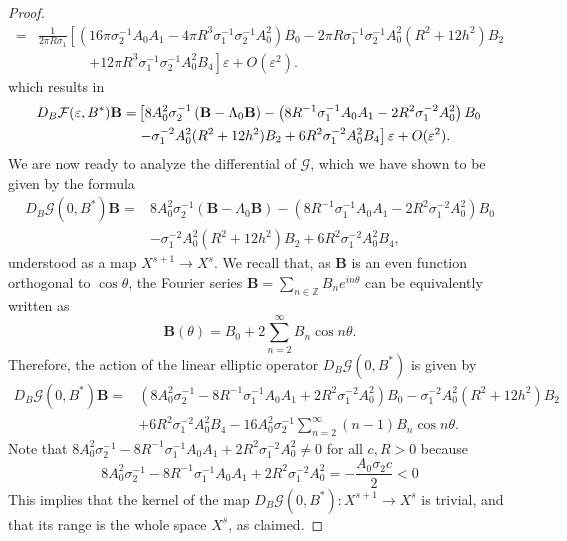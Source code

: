\documentclass[12pt,reqno]{amsart}
\numberwithin{equation}{section}
\theoremstyle{definition}
\theoremstyle{remark}
\begin{document}
\begin{proof}
\begin{align*}
=& \frac{1}{2\pi R\sigma_1}\left[ \left (16\pi\sigma_2^{-1}A_0A_1-4\pi R^3\sigma_1^{-1}\sigma_2^{-1}A_0^2\right )B_0
	-2\pi R\sigma_1^{-1}\sigma_2^{-1}A_0^2(R^2+12h^2)B_2\right .\\
&\,\,\,\,\,\,\,\,\,\,\quad\quad	\left .+{12\pi R^3\sigma_1^{-1}\sigma_2^{-1}A_0^2B_4}\right]  
\varepsilon+O\left (\varepsilon^2\right ). 
\end{align*}
which results in
\begin{align*}%
D_B\mathcal{F}(\varepsilon,B^*) \textbf{B}
=&\left[ 8A_0^2\sigma_2^{-1}\left (  \textbf{B}-\Lambda_0  \textbf{B}\right ) -\left (8R^{-1}\sigma_1^{-1}A_0A_1-2R^2\sigma_1^{-2}A_0^2\right )B_0\right . \notag\\
& 
\left . - \sigma_1^{-2}A_0^2(R^2+12h^2)B_2+6R^2\sigma_1^{-2}A_0^2B_4
\right]
\varepsilon+O(\varepsilon^2).
\end{align*}
We are now ready to analyze the differential of $\mathcal{G}$, which we have shown to be given by the formula
\begin{align*}
D_B\mathcal{G}(0,B^*)  \textbf{B}
= & 8A_0^2\sigma_2^{-1}\left (  \textbf{B}-\Lambda_0  \textbf{B}\right ) -\left (8R^{-1}\sigma_1^{-1}A_0A_1-2R^2\sigma_1^{-2}A_0^2\right )B_0 \\
& - \sigma_1^{-2}A_0^2(R^2+12h^2)B_2+6R^2\sigma_1^{-2}A_0^2B_4, 
\end{align*}
understood as a map $X^{s+1} \to X^s$.
We recall that, as $  \textbf{B}$ is an even function orthogonal to $\cos\theta$, the Fourier series $  \textbf{B} = \sum_{n\in\mathbb{Z}}   B_n e^{in\theta}$ can be equivalently written as
\[
  \textbf{B}(\theta) =   B_0 + 2\sum_{n=2}^\infty   B_n \cos n\theta .
\]
	Therefore, the action of the linear elliptic operator $D_B\mathcal{G}(0,B^*)$ is given by
\begin{align*}
D_B\mathcal{G}(0,B^*)  \textbf{B}
= & \left( 8A_0^2\sigma_2^{-1}  - 8R^{-1}\sigma_1^{-1}A_0A_1+2R^2\sigma_1^{-2}A_0^2\right )B_0 - \sigma_1^{-2}A_0^2(R^2+12h^2)B_2\\
& +6R^2\sigma_1^{-2}A_0^2B_4-16A_0^2\sigma_2^{-1}\sum_{n=2}^\infty (n-1)   B_n \cos n\theta .
\end{align*}	
 Note that $ 8A_0^2\sigma_2^{-1}  - 8R^{-1}\sigma_1^{-1}A_0A_1+2R^2\sigma_1^{-2}A_0^2\neq 0 $ for all $ c,R>0 $ because
\[
8A_0^2\sigma_2^{-1}  - 8R^{-1}\sigma_1^{-1}A_0A_1+2R^2\sigma_1^{-2}A_0^2=-\frac{A_0\sigma_2c}{2}<0 
\]
This implies that the kernel of the map $D_B\mathcal{G}(0,B^*): X^{s+1} \to X^s$ is trivial, and that its range is the whole space $X^s$, as claimed.


\end{proof}
\end{document}
